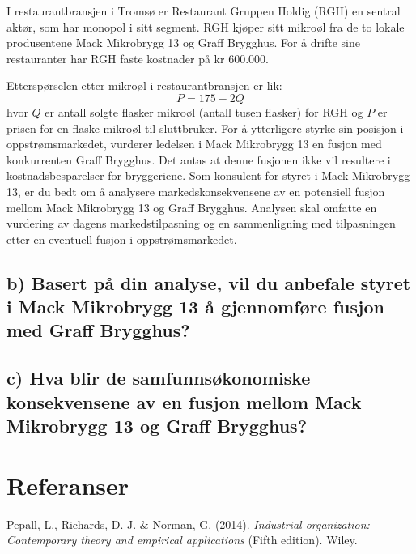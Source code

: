 \documentclass[
  12pt,
  a4paper,
  DIV=11,
  numbers=noendperiod]{scrartcl}
\newlength{\cslhangindent}
\newenvironment{CSLReferences}[2] %
 {\begin{list}{}{%
  \setlength{\itemindent}{0pt}
  \setlength{\leftmargin}{0pt}
  \setlength{\parsep}{0pt}
  \ifodd #1
   \setlength{\leftmargin}{\cslhangindent}
   \setlength{\itemindent}{-1\cslhangindent}
  \fi
  \setlength{\itemsep}{#2\baselineskip}}}
 {\end{list}}
\begin{document}
I restaurantbransjen i Tromsø er Restaurant Gruppen Holdig (RGH) en
sentral aktør, som har monopol i sitt segment. RGH kjøper sitt mikroøl
fra de to lokale produsentene Mack Mikrobrygg 13 og Graff Brygghus. For
å drifte sine restauranter har RGH faste kostnader på kr 600.000.

Etterspørselen etter mikroøl i restaurantbransjen er lik: \[
P = 175 - 2Q
\] hvor \(Q\) er antall solgte flasker mikroøl (antall tusen flasker)
for RGH og \(P\) er prisen for en flaske mikroøl til sluttbruker. For å
ytterligere styrke sin posisjon i oppstrømsmarkedet, vurderer ledelsen i
Mack Mikrobrygg 13 en fusjon med konkurrenten Graff Brygghus. Det antas
at denne fusjonen ikke vil resultere i kostnadsbesparelser for
bryggeriene. Som konsulent for styret i Mack Mikrobrygg 13, er du bedt
om å analysere markedskonsekvensene av en potensiell fusjon mellom Mack
Mikrobrygg 13 og Graff Brygghus. Analysen skal omfatte en vurdering av
dagens markedstilpasning og en sammenligning med tilpasningen etter en
eventuell fusjon i oppstrømsmarkedet.

\subsection{b) Basert på din analyse, vil du anbefale styret i Mack
Mikrobrygg 13 å gjennomføre fusjon med Graff
Brygghus?}\label{b-basert-puxe5-din-analyse-vil-du-anbefale-styret-i-mack-mikrobrygg-13-uxe5-gjennomfuxf8re-fusjon-med-graff-brygghus}

\subsection{c) Hva blir de samfunnsøkonomiske konsekvensene av en fusjon
mellom Mack Mikrobrygg 13 og Graff
Brygghus?}\label{c-hva-blir-de-samfunnsuxf8konomiske-konsekvensene-av-en-fusjon-mellom-mack-mikrobrygg-13-og-graff-brygghus}

\clearpage

\section{Referanser}\label{referanser}

\label{refs}
\begin{CSLReferences}{1}{0}
Pepall, L., Richards, D. J. \& Norman, G. (2014). \emph{Industrial
organization: Contemporary theory and empirical applications} (Fifth
edition). Wiley.

\end{CSLReferences}
\end{document}
